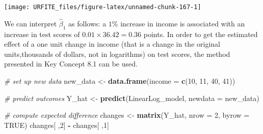 \documentclass[]{book}
\newenvironment{Shaded}{\begin{snugshade}}{\end{snugshade}}
\newcommand{\KeywordTok}[1]{\textcolor[rgb]{0.13,0.29,0.53}{\textbf{#1}}}
\newcommand{\DataTypeTok}[1]{\textcolor[rgb]{0.13,0.29,0.53}{#1}}
\newcommand{\DecValTok}[1]{\textcolor[rgb]{0.00,0.00,0.81}{#1}}
\newcommand{\StringTok}[1]{\textcolor[rgb]{0.31,0.60,0.02}{#1}}
\newcommand{\CommentTok}[1]{\textcolor[rgb]{0.56,0.35,0.01}{\textit{#1}}}
\newcommand{\OtherTok}[1]{\textcolor[rgb]{0.56,0.35,0.01}{#1}}
\newcommand{\OperatorTok}[1]{\textcolor[rgb]{0.81,0.36,0.00}{\textbf{#1}}}
\newcommand{\NormalTok}[1]{#1}
\theoremstyle{definition}
\theoremstyle{definition}
\theoremstyle{definition}
\theoremstyle{remark}
\begin{document}
\begin{Shaded}
\end{Shaded}

\begin{center}\texttt{[image: URFITE\_files/figure-latex/unnamed-chunk-167-1]} \end{center}

We can interpret \(\hat{\beta}_1\) as follows: a \(1\%\) increase in
income is associated with an increase in test scores of
\(0.01 \times 36.42 = 0.36\) points. In order to get the estimated
effect of a one unit change in income (that is a change in the original
units,thousands of dollars, not in logarithms) on test scores, the
method presented in Key Concept 8.1 can be used.

\begin{Shaded}
\begin{Highlighting}[]
\CommentTok{# set up new data}
\NormalTok{new_data <-}\StringTok{ }\KeywordTok{data.frame}\NormalTok{(}\DataTypeTok{income =} \KeywordTok{c}\NormalTok{(}\DecValTok{10}\NormalTok{, }\DecValTok{11}\NormalTok{, }\DecValTok{40}\NormalTok{, }\DecValTok{41}\NormalTok{))}

\CommentTok{# predict outcomes }
\NormalTok{Y_hat <-}\StringTok{ }\KeywordTok{predict}\NormalTok{(LinearLog_model, }\DataTypeTok{newdata =}\NormalTok{ new_data)}

\CommentTok{# compute expected difference}
\NormalTok{changes <-}\StringTok{ }\KeywordTok{matrix}\NormalTok{(Y_hat, }\DataTypeTok{nrow =} \DecValTok{2}\NormalTok{, }\DataTypeTok{byrow =} \OtherTok{TRUE}\NormalTok{)}
\NormalTok{changes[ ,}\DecValTok{2}\NormalTok{] }\OperatorTok{-}\StringTok{ }\NormalTok{changes[ ,}\DecValTok{1}\NormalTok{]}
\end{Highlighting}
\end{Shaded}
\end{document}
